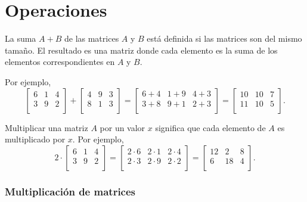 \section{Operaciones}

La suma $A+B$ de las matrices $A$ y $B$ está definida si las matrices son del
mismo tamaño. El resultado es una matriz donde cada elemento es la suma de los
elementos correspondientes en $A$ y $B$.

Por ejemplo,
\[
    \begin{bmatrix}
        6 & 1 & 4 \\
        3 & 9 & 2 \\
    \end{bmatrix}
    +
    \begin{bmatrix}
        4 & 9 & 3 \\
        8 & 1 & 3 \\
    \end{bmatrix}
    =
    \begin{bmatrix}
        6+4 & 1+9 & 4+3 \\
        3+8 & 9+1 & 2+3 \\
    \end{bmatrix}
    =
    \begin{bmatrix}
        10 & 10 & 7 \\
        11 & 10 & 5 \\
    \end{bmatrix}.
\]

Multiplicar una matriz $A$ por un valor $x$ significa que cada elemento de $A$
es multiplicado por $x$. Por ejemplo,
\[
    2 \cdot \begin{bmatrix}
        6 & 1 & 4 \\
        3 & 9 & 2 \\
    \end{bmatrix}
    =
    \begin{bmatrix}
        2 \cdot 6 & 2\cdot1 & 2\cdot4 \\
        2\cdot3   & 2\cdot9 & 2\cdot2 \\
    \end{bmatrix}
    =
    \begin{bmatrix}
        12 & 2  & 8 \\
        6  & 18 & 4 \\
    \end{bmatrix}.
\]

\subsubsection{Multiplicación de matrices}

